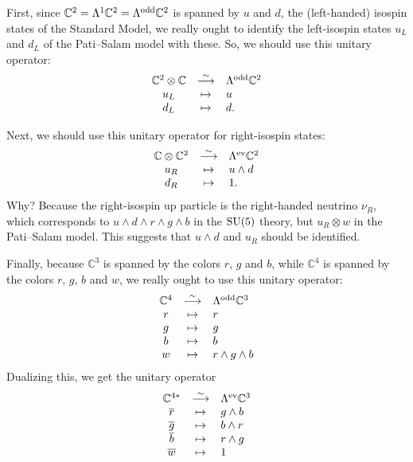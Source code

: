 \documentclass{article}
\newcommand{\C}{{\mathbb C}}  %
\newcommand{\SU}{{\rm SU}}    %
\newcommand{\Ex}{\Lambda} %
\newcommand{\Exev}{\Lambda^{\rm ev}} %
\newcommand{\Exodd}{\Lambda^{\rm odd}} %
\begin{document}
First, since $\C^2 = \Ex^1 \C^2 = \Exodd \C^2$ is spanned by $u$ and
$d$, the (left-handed) isospin states of the Standard Model, we really ought
to identify the left-isospin states $u_L$ and $d_L$ of the Pati--Salam model
with these.  So, we should use this unitary operator:
\[          
\begin{array}{ccl}
 \C^2 \otimes \C & \stackrel{\sim}{\longrightarrow} &  \Exodd \C^2  \\
             u_L & \mapsto & u   \\
             d_L & \mapsto & d .
\end{array}
\]

Next, we should use this unitary operator for right-isospin states:
\[          
\begin{array}{ccl}
 \C \otimes \C^2 & \stackrel{\sim}{\longrightarrow} &  \Exev \C^2  \\
             u_R & \mapsto & u \wedge d   \\
             d_R & \mapsto & 1 .
\end{array}
\]
Why?  Because the right-isospin up particle is the right-handed neutrino 
$\nu_R$, which corresponds to $u \wedge d \wedge r \wedge g \wedge b$ 
in the $\SU(5)$ theory, but $u_R \otimes w$ 
in the Pati--Salam model.  This suggests that $u \wedge d$ and $u_R$
should be identified.

Finally, because $\C^3$ is spanned by the colors $r$, $g$ and $b$, while
$\C^4$ is spanned by the colors $r$, $g$, $b$ and $w$, we really ought
to use this unitary operator:
\[          
\begin{array}{ccl}
 \C^4 & \stackrel{\sim}{\longrightarrow} &  \Exodd \C^3  \\
    r & \mapsto & r \\ 
    g & \mapsto & g \\ 
    b & \mapsto & b \\ 
    w & \mapsto & r \wedge g \wedge b 
\end{array}
\]
Dualizing this, we get the unitary operator
\[          
\begin{array}{ccl}
 \C^{4*} & \stackrel{\sim}{\longrightarrow} &  \Exev \C^3  \\
    \overline{r} & \mapsto & g \wedge b \\ 
    \overline{g} & \mapsto & b \wedge r \\ 
    \overline{b} & \mapsto & r \wedge g \\ 
    \overline{w} & \mapsto & 1
\end{array}
\]
\end{document}
